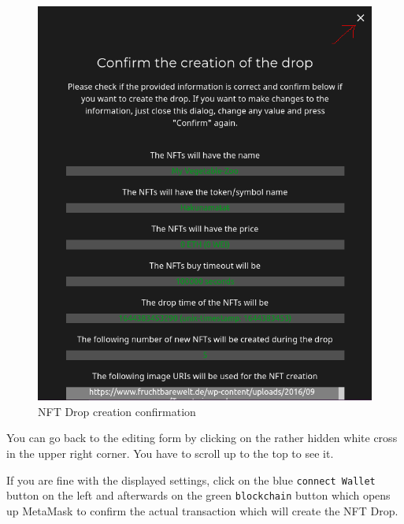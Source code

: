 \documentclass[
]{article}
\begin{document}
\begin{figure}
\centering
\includegraphics{images/nft_drop_creation_confirmation.png}
\caption{NFT Drop creation confirmation}
\end{figure}\newpage

You can go back to the editing form by clicking on the rather hidden
white cross in the upper right corner. You have to scroll up to the top
to see it.

If you are fine with the displayed settings, click on the blue
\texttt{connect\ Wallet} button on the left and afterwards on the green
\texttt{blockchain} button which opens up MetaMask to confirm the actual
transaction which will create the NFT Drop.
\end{document}
